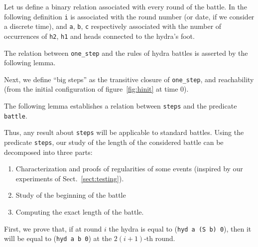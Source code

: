 Let us define a binary relation associated with every round of the battle.
In the following definition \texttt{i} is associated with the round number (or date, if we consider a discrete time), and \texttt{a}, \texttt{b}, \texttt{c} respectively associated with the number of occurrences of \texttt{h2}, \texttt{h1} and heads connected to the hydra's foot.



The relation between \texttt{one\_step} and the rules of hydra battles is asserted by the following lemma. 

\label{lemma:step-battle}



\vspace{4pt}

Next, we define ``big steps'' as the transitive closure of \texttt{one\_step},
and reachability (from the initial configuration of figure~\ref{fig:hinit} at time $0$).






The following lemma establishes a relation between \texttt{steps} and the predicate \texttt{battle}.



\vspace{4pt}

Thus, any result about \texttt{steps} will be applicable to standard battles.
Using the predicate \texttt{steps},  our study of the length of the considered battle
can  be decomposed into three parts:

\begin{enumerate}
\item  Characterization and proofs of regularities of some events (inspired by our experiments of Sect.~\ref{sect:testing}).
\item Study of the beginning of the battle
\item Computing the exact length of the battle.
\end{enumerate}

First, we prove that, if at round $i$ the hydra is equal to
(\texttt{hyd a (S b) 0}), then it will be equal to (\texttt{hyd a b 0}) at the $2(i+1)$-th round.

\vspace{4pt}




